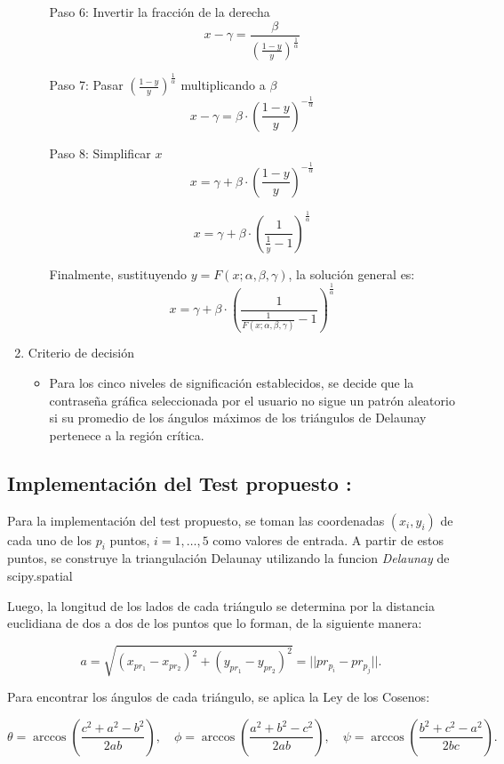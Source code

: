 \documentclass[12pt]{report}
\begin{document}
\begin{enumerate}
\begin{itemize}
		Paso 6: Invertir la fracción de la derecha
		\[
		x - \gamma = \frac{\beta}{\left( \frac{1 - y}{y} \right)^{\frac{1}{\alpha}}}
		\]
				
		Paso 7: Pasar \( \left( \frac{1 - y}{y} \right)^{\frac{1}{\alpha}} \) multiplicando a \( \beta \)
		\[
		x - \gamma = \beta \cdot \left( \frac{1 - y}{y} \right)^{-\frac{1}{\alpha}}
		\]
		
		Paso 8: Simplificar \( x \)
		\[
		x = \gamma + \beta \cdot \left( \frac{1 - y}{y} \right)^{-\frac{1}{\alpha}}
		\]
		
		\[
		x = \gamma + \beta \cdot \left( \frac{1}{\frac{1}{y}-1} \right)^{\frac{1}{\alpha}}
		\]
		
		Finalmente, sustituyendo \( y = F(x; \alpha, \beta, \gamma) \), la solución general es:
		\[
		x = \gamma + \beta \cdot \left( \frac{1}{\frac{1}{F(x; \alpha, \beta, \gamma)}-1} \right)^{\frac{1}{\alpha}}
		\]
		
	\end{itemize}
	\item Criterio de decisión
	\begin{itemize}
		\item Para los cinco niveles de significación establecidos, se decide que la contraseña gráfica seleccionada por el usuario no sigue un patrón aleatorio si su promedio de los ángulos máximos de los triángulos de Delaunay  pertenece a la región crítica. 
	\end{itemize}
\end{enumerate}
\subsection{Implementación del Test propuesto :}

Para la implementación del test propuesto, se toman las coordenadas \((x_i, y_i)\) de cada uno de los \(p_i\) puntos, \(i = 1, \ldots, 5\) como valores de entrada. A partir de estos puntos, se construye la triangulación Delaunay utilizando la funcion \textit{Delaunay} de scipy.spatial

Luego, la longitud de los lados de cada triángulo se determina por la distancia euclidiana de dos a dos de los puntos que lo forman, de la siguiente manera:

\[
a = \sqrt{(x_{pr_1} - x_{pr_2})^2 + (y_{pr_1} - y_{pr_2})^2} = ||pr_{p_i} - pr_{p_j}||.
\]

Para encontrar los ángulos de cada triángulo, se aplica la Ley de los Cosenos:

\[
\theta = \arccos\left(\frac{c^2 + a^2 - b^2}{2ab}\right), \quad \phi = \arccos\left(\frac{a^2 + b^2 - c^2}{2ab}\right), \quad \psi = \arccos\left(\frac{b^2 + c^2 - a^2}{2bc}\right).
\]
\end{document}
